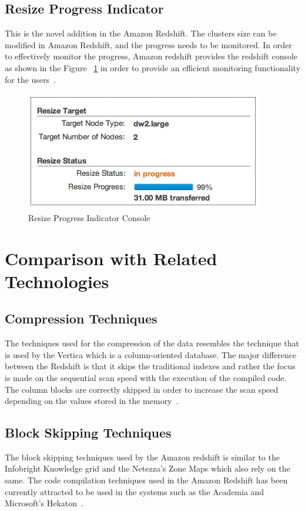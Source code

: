 	 \subsection{Resize Progress Indicator}
	  This is the novel addition in the Amazon Redshift. The clusters 
	  size can be modified in Amazon Redshift, and the progress 
	  needs to be monitored. In order to effectively monitor the progress, 
	  Amazon redshift provides the redshift console as shown in the Figure 
	  ~\ref{sa:ind} in order to provide an efficient monitoring 
	  functionality for 
	  the users~\cite{hid-sp18-412-Features_Amazon_Redshift}.
	\label{sa:ind}
	\begin{figure}[!ht]
	\centering\includegraphics[width=\columnwidth]
	{images/resize-indicator.png}
	\caption{Resize Progress Indicator 
	Console~\cite{hid-sp18-412-Features_Amazon_Redshift}}\label{sa:ind}
	\end{figure}
	
\section{Comparison with Related Technologies}
\label{s:comp}
	\subsection{Compression Techniques}
	The techniques used for the compression of the data resembles the 
	technique that is used by the Vertica which is a column-oriented 
	database. The major difference between the Redshift is that it 
	skips the traditional indexes and rather the focus is made on the 
	sequential scan speed with the execution of the compiled code. 
	The column blocks are correctly skipped in order to increase the 
	scan speed depending on the values stored in 
	the memory~\cite{hid-sp18-412_Gupta_2015_ARC}.
        
	\subsection{Block Skipping Techniques}
	 The block skipping techniques used by the Amazon redshift is similar 
	 to the Infobright Knowledge grid and the Netezza’s Zone Maps which 
	 also rely on the same. The code compilation techniques used in the 
	 Amazon Redshift has been currently attracted to be used in the 
	 systems such as the Academia and 
	 Microsoft’s Hekaton~\cite{hid-sp18-412_Gupta_2015_ARC}.
        
